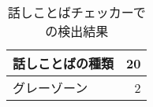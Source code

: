 \begin{table}[H]
\centering
\caption{話しことばチェッカーでの検出結果}
\label{result-checker-detect}
\begin{tabular}{|l|r|}
\hline
話しことばの種類 & 20 \\ \hline
グレーゾーン & 2 \\ \hline
\end{tabular}
\end{table}

